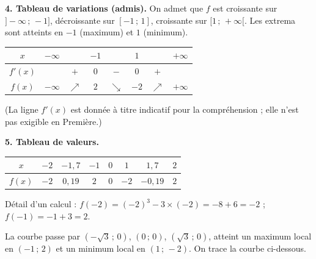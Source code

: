 \documentclass[11pt]{article}
\begin{document}
\begin{exoresolu}[Étude complète de $f(x) = x^3 - 3x$]
\textbf{4. Tableau de variations (admis).} On admet que $f$ est croissante sur $]-\infty\,;\,-1]$, décroissante sur $[-1\,;\,1]$, croissante sur $[1\,;\,+\infty[$. Les extrema sont atteints en $-1$ (maximum) et $1$ (minimum).

\begin{center}
\begin{tabular}{|c|ccccccc|}
\hline
$x$ & $-\infty$ & & $-1$ & & $1$ & & $+\infty$ \\
\hline
$f'(x)$ & & $+$ & $0$ & $-$ & $0$ & $+$ & \\
\hline
$f(x)$ & $-\infty$ & $\nearrow$ & $2$ & $\searrow$ & $-2$ & $\nearrow$ & $+\infty$ \\
\hline
\end{tabular}
\end{center}
(La ligne $f'(x)$ est donnée à titre indicatif pour la compréhension ; elle n'est pas exigible en Première.)

\textbf{5. Tableau de valeurs.}

\begin{center}
\begin{tabular}{|c|ccccccc|}
\hline
$x$ & $-2$ & $-1{,}7$ & $-1$ & $0$ & $1$ & $1{,}7$ & $2$ \\
\hline
$f(x)$ & $-2$ & $0{,}19$ & $2$ & $0$ & $-2$ & $-0{,}19$ & $2$ \\
\hline
\end{tabular}
\end{center}

Détail d'un calcul : $f(-2) = (-2)^3 - 3\times(-2) = -8 + 6 = -2$ ; $f(-1) = -1 + 3 = 2$.

La courbe passe par $(-\sqrt{3}\,;\,0)$, $(0\,;\,0)$, $(\sqrt{3}\,;\,0)$, atteint un maximum local en $(-1\,;\,2)$ et un minimum local en $(1\,;\,-2)$. On trace la courbe ci-dessous.
\end{exoresolu}
\end{document}
